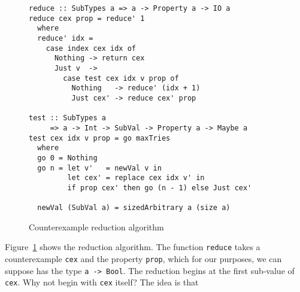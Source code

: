 \documentclass[9pt]{sigplanconf}
\newenvironment{code}{\begin{alltt}\scriptsize}{\end{alltt}}
\newcommand{\ttp}[1]{\texttt{#1}}
\begin{document}
\begin{figure}[ht]
  \begin{lstlisting}
reduce :: SubTypes a => a -> Property a -> IO a
reduce cex prop = reduce' 1
  where
  reduce' idx =
    case index cex idx of 
      Nothing -> return cex
      Just v  -> 
        case test cex idx v prop of
          Nothing   -> reduce' (idx + 1)
          Just cex' -> reduce cex' prop

test :: SubTypes a 
     => a -> Int -> SubVal -> Property a -> Maybe a
test cex idx v prop = go maxTries
  where
  go 0 = Nothing
  go n = let v'   = newVal v in
         let cex' = replace cex idx v' in
         if prop cex' then go (n - 1) else Just cex'

  newVal (SubVal a) = sizedArbitrary a (size a)
  \end{lstlisting}
  \caption{Counterexample reduction algorithm\label{fig:reduction}}
\end{figure}

Figure~\ref{fig:reduction} shows the reduction algorithm.  The function
\ttp{reduce} takes a counterexample \ttp{cex} and the property \ttp{prop}, which
for our purposes, we can suppose has the type \ttp{a -> Bool}.  The reduction
begins at the first sub-value of \ttp{cex}.  Why not begin with \ttp{cex}
itself?  The idea is that 




\end{document}
